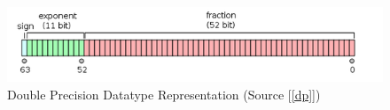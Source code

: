 \begin{figure}[!h]
\centering
\includegraphics[scale=0.75]{figures/doublePrecison.png}
\caption{Double Precision Datatype Representation (Source [\ref{dp}])}
\label{fig:doublep}
\end{figure}